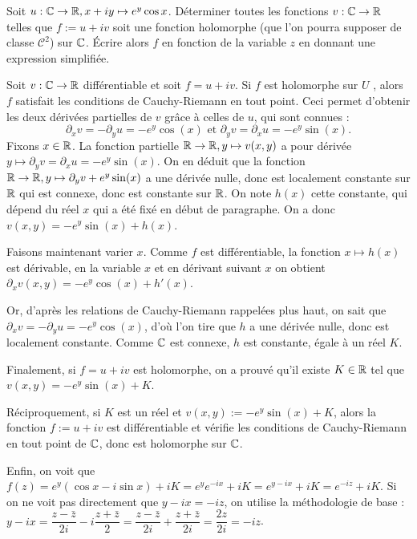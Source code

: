 \begin{exo}
Soit $u : \mathbb{C}\to \mathbb{R},  x+iy \mapsto e^y\cos x$. 
Déterminer toutes les fonctions $v : \mathbb{C}\to \mathbb{R}$ telles que $f:=u+iv$ soit une fonction holomorphe (que l'on pourra supposer de classe $\mathcal C^2$) sur $\mathbb{C}$. 
Écrire alors $f$ en fonction de la variable $z$ en donnant une expression simplifiée.
\begin{sol}
Soit $v : \mathbb{C}\to \mathbb{R}$ différentiable et soit $f=u+iv$. 
Si $f$ est holomorphe sur $U$ , alors $f$ satisfait les conditions de Cauchy-Riemann en tout point.
Ceci permet d'obtenir les deux dérivées partielles de $v$ grâce à celles de $u$, qui sont connues :
\[ \partial_x v = -\partial_y u = -e^y\cos(x) \text{ et } \partial_y v = \partial_x u = -e^y\sin(x).\]
Fixons $x\in \mathbb{R}$.  La fonction partielle $\mathbb{R}\to \mathbb{R}, y\mapsto v(x,y)$ a pour dérivée $y\mapsto \partial_y v = \partial_x u = -e^y\sin(x)$.  On en déduit que la fonction $\mathbb{R}\to\mathbb{R}, y\mapsto  \partial_y v + e^y\sin(x)$ a une dérivée nulle, donc est localement constante sur $\mathbb{R}$ qui est connexe, donc est constante sur $\mathbb{R}$. On note $h(x)$ cette constante, qui dépend du réel $x$ qui a été fixé en début de paragraphe. 
On a donc $v(x,y) = -e^y\sin(x) +h(x)$.


Faisons maintenant varier $x$. Comme $f$ est différentiable, la fonction $x\mapsto h(x)$ est dérivable, en la variable $x$ et en dérivant suivant $x$ on obtient $\partial_xv (x,y) = -e^y\cos(x)+h'(x)$.

Or, d'après les relations de Cauchy-Riemann rappelées plus haut, on sait que $ \partial_x v = -\partial_y u = -e^y\cos(x)$, d'où l'on tire que $h$ a une dérivée nulle, donc est localement constante. Comme $\mathbb{C}$ est connexe, $h$ est constante, égale à un réel $K$.

Finalement,  si $f=u+iv$ est holomorphe, on a prouvé qu'il existe $K\in \mathbb{R}$ tel que $v(x,y)=-e^y\sin(x)+K$.

Réciproquement, si $K$ est un réel et $v(x,y):=-e^y\sin(x)+K$, alors la fonction $f:=u+iv$ est différentiable et vérifie les conditions de Cauchy-Riemann en tout point de $\mathbb{C}$, donc est holomorphe sur $\mathbb{C}$.

Enfin, on voit que $f(z)=e^y(\cos x-i\sin x)+iK = e^ye^{-ix}+iK = e^{y-ix}+iK = e^{-iz}+iK$. 
Si on ne voit pas directement que $y-ix=-iz$, on utilise la méthodologie de base :
$y-ix = \dfrac{z-\bar z}{2i} - i \dfrac{z+\bar z}{2} 
=\dfrac{z-\bar z}{2i} + \dfrac{z+\bar z}{2i}
=  \dfrac{2z}{2i}= -iz$.
\end{sol}
\end{exo}

